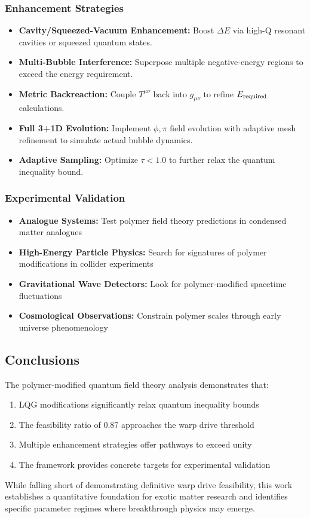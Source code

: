\documentclass[11pt]{article}
\begin{document}
\subsubsection*{Enhancement Strategies}
\begin{itemize}
  \item \textbf{Cavity/Squeezed-Vacuum Enhancement:}
        Boost $\Delta E$ via high-Q resonant cavities or squeezed quantum states.
  \item \textbf{Multi-Bubble Interference:}
        Superpose multiple negative-energy regions to exceed the energy requirement.
  \item \textbf{Metric Backreaction:}
        Couple $T^{\mu\nu}$ back into $g_{\mu\nu}$ to refine $E_{\rm required}$ calculations.
  \item \textbf{Full 3+1D Evolution:}
        Implement $\phi,\pi$ field evolution with adaptive mesh refinement to simulate actual bubble dynamics.
  \item \textbf{Adaptive Sampling:}
        Optimize $\tau < 1.0$ to further relax the quantum inequality bound.
\end{itemize}

\subsubsection*{Experimental Validation}
\begin{itemize}
  \item \textbf{Analogue Systems:} Test polymer field theory predictions in condensed matter analogues
  \item \textbf{High-Energy Particle Physics:} Search for signatures of polymer modifications in collider experiments  
  \item \textbf{Gravitational Wave Detectors:} Look for polymer-modified spacetime fluctuations
  \item \textbf{Cosmological Observations:} Constrain polymer scales through early universe phenomenology
\end{itemize}

\subsection*{Conclusions}
The polymer-modified quantum field theory analysis demonstrates that:
\begin{enumerate}
  \item LQG modifications significantly relax quantum inequality bounds
  \item The feasibility ratio of 0.87 approaches the warp drive threshold
  \item Multiple enhancement strategies offer pathways to exceed unity
  \item The framework provides concrete targets for experimental validation
\end{enumerate}

While falling short of demonstrating definitive warp drive feasibility, this work establishes a quantitative foundation for exotic matter research and identifies specific parameter regimes where breakthrough physics may emerge.
\end{document}
